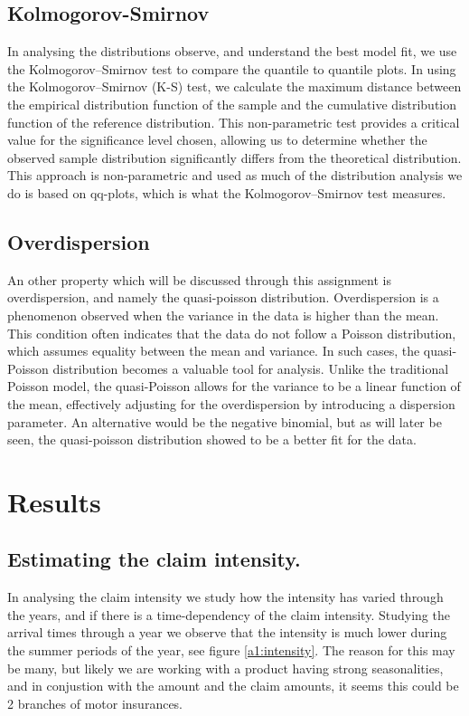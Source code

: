 \documentclass[11pt]{article}
\begin{document}
\subsection{Kolmogorov-Smirnov}
In analysing the distributions observe, and understand the best model fit, we use the Kolmogorov–Smirnov test to compare the quantile to quantile plots.
In using the Kolmogorov–Smirnov (K-S) test, we calculate the maximum distance between the empirical distribution function of the sample and the cumulative distribution function of the reference distribution. 
This non-parametric test provides a critical value for the significance level chosen, allowing us to determine whether the observed sample distribution significantly differs from the theoretical distribution. 
This approach is non-parametric and used as much of the distribution analysis we do is based on qq-plots, which is what the Kolmogorov–Smirnov test measures.

\subsection{Overdispersion}
An other property which will be discussed through this assignment is overdispersion, and namely the quasi-poisson distribution.
Overdispersion is a phenomenon observed when the variance in the data is higher than the mean. This condition often indicates that the data do not follow a Poisson distribution, which assumes equality between the mean and variance. 
In such cases, the quasi-Poisson distribution becomes a valuable tool for analysis. 
Unlike the traditional Poisson model, the quasi-Poisson allows for the variance to be a linear function of the mean, effectively adjusting for the overdispersion by introducing a dispersion parameter.  
An alternative would be the negative binomial, but as will later be seen, the quasi-poisson distribution showed to be a better fit for the data.

\section*{Results}

\subsection*{Estimating the claim intensity.}
In analysing the claim intensity we study how the intensity has varied through the years, and if there is a time-dependency of the claim intensity.
Studying the arrival times through a year we observe that the intensity is much lower during the summer periods of the year, see figure \ref{a1:intensity}. 
The reason for this may be many, but likely we are working with a product having strong seasonalities, and in conjustion with the amount and the claim amounts, it seems this could be 2 branches of motor insurances.
\end{document}
